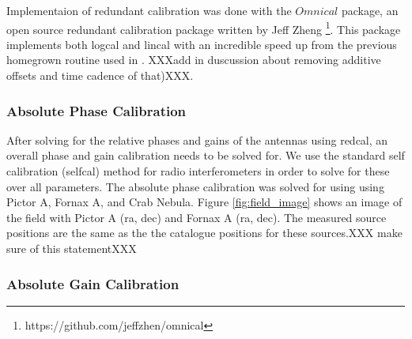 \documentclass[twocolumn,numberedappendix]{emulateapj}
\begin{document}
Implementaion of redundant calibration was done with the ${Omnical}$ package, an
open source redundant calibration package written by Jeff
Zheng \footnote{https://github.com/jeffzhen/omnical}\cite{zheng_et_al2014}. This
package implements both logcal and lincal with an incredible speed up from
the previous homegrown routine used in \cite{parsons_et_al2014a}. 
XXXadd in duscussion about removing additive offsets and time cadence of
that)XXX.

\subsubsection{Absolute Phase Calibration}
%

After solving for the relative phases and gains of the antennas using redcal, an
overall phase and gain calibration needs to be solved for. We use the standard self
calibration (selfcal) method for radio interferometers in order to solve for
these over all parameters. The absolute phase calibration was solved for using using 
Pictor A, Fornax A, and Crab Nebula. Figure \ref{fig:field_image} shows an
image of the field with Pictor A (ra, dec)  and Fornax A (ra, dec). The
measured source positions are the same as the the catalogue positions for these
sources.XXX make sure of this statementXXX

\subsubsection{Absolute Gain Calibration}
%
%
%
%
\end{document}
